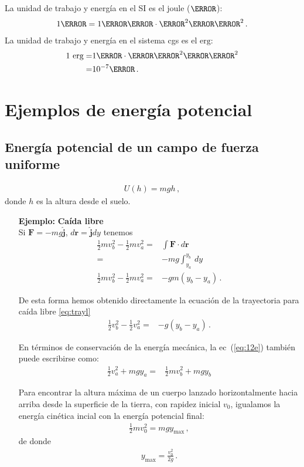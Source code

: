 La unidad de trabajo y energía en el SI es el joule ($\joule$):
\begin{align}
  1\joule=1\kilo\gram\cdot \metre^2\per\second^2\,.
\end{align}
La unidad de trabajo y energía en el sistema cgs es el $\text{erg}$:
\begin{align}
  1\ \text{erg}=&1\gram\cdot\centi\meter^2\per\second^2\nonumber\\
=&10^{-7}\joule\,.
\end{align}

\section{Ejemplos de energía potencial}

\subsection{Energía potencial de un campo de fuerza uniforme}
\begin{align}
  U(h)=mgh\,,
\end{align}
donde $h$ es la altura desde el suelo.

\begin{itemize}
\item[\textbf{Ejemplo:}] \textbf{Caída libre}\\
Si $\mathbf{F}=-mg\hat{\mathbf{j}}$, $d\mathbf{r}=\hat{\mathbf{j}}dy$ tenemos
\begin{align}
\label{eq:12e}
  \tfrac{1}{2}mv_b^2-\tfrac{1}{2}mv_a^2=&\int\mathbf{F}\cdot d\mathbf{r}\nonumber\\
  =&-mg \int_{y_a}^{y_b}\, dy\nonumber\\
  \tfrac{1}{2}mv_b^2-\tfrac{1}{2}mv_a^2=&-gm(y_b-y_a)\,.
\end{align}

De esta forma hemos obtenido directamente la ecuación de la trayectoria para caída libre \eqref{eq:trayl}
\begin{align}
  \tfrac{1}{2}v_b^2-\tfrac{1}{2}v_a^2=&-g(y_b-y_a)\,.
\end{align}

En términos de conservación de la energía mecánica, la ec~(\ref{eq:12e}) también puede escribirse como:
\begin{align}
  \tfrac{1}{2}v_a^2+mgy_a=&\tfrac{1}{2}mv_b^2+mgy_b
\end{align}


Para encontrar la altura máxima de un cuerpo lanzado horizontalmente hacia arriba desde la superficie de la tierra, con rapidez inicial $v_0$, igualamos la energía cinética incial con la energía potencial final:
\begin{align}
  \frac{1}{2}mv_0^2=mgy_{\text{max}}\,,
\end{align}
de donde
\begin{align}
  y_{\text{max}}=\frac{v_0^2}{2g}\,.
\end{align}

\end{itemize}


